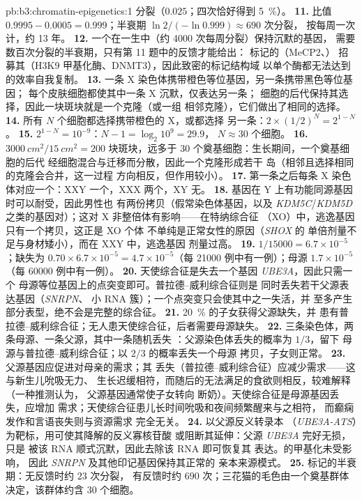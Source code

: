 \begin{solution}{pb:b3:chromatin-epigenetics:1}
分裂（$0.025$；四次恰好得到 \qty{5}{\%}）。
\textbf{11.} 比值 $0.9995 - 0.0005 = 0.999$；半衰期 $\ln
2/(-\ln 0.999) \approx 690$ 次分裂，
按每周一次计，约 \num{13} 年。
\textbf{12.} 一个在一生中（约 \num{4000} 次每周分裂）保持沉默的基因，
需要数百次分裂的半衰期，只有第 11 题中的反馈才能给出：
标记的（MeCP2、）
招募其（H3K9 甲基化酶、DNMT3），因此致密的标记结构域
以单个酶都无法达到的效率自我复制。
\textbf{13.} 一条 X 染色体携带橙色等位基因，另一条携带黑色等位基因；
每个皮肤细胞都使其中一条 X 沉默，仅表达另一条；
细胞的后代保持其选择，因此一块斑块就是一个克隆（或一组
相邻克隆），它们做出了相同的选择。
\textbf{14.} 所有 $N$ 个细胞都选择携带橙色的 X，或都选择
另一条：$2\times (1/2)^{N} = 2^{1-N}$。
\textbf{15.} $2^{1-N} = 10^{-9}$：$N - 1 = \log_{2} 10^{9} = 29.9$，
$N \approx 30$ 个细胞。
\textbf{16.} $\qty{3000}{cm^2}/\qty{15}{cm^2} = 200$ 块斑块，远多于
$30$ 个奠基细胞：生长期间，一个奠基细胞的后代
经细胞混合与迁移而分散，因此一个克隆形成若干
岛（相邻且选择相同的克隆会合并，这一过程
方向相反，但作用较小）。
\textbf{17.} 第一条之后每条 X 染色体对应一个：XXY 一个，XXX 两个，XY
无。
\textbf{18.} 基因在 Y 上有功能同源基因时可以耐受，因此男性也
有两份拷贝（假常染色体基因，以及
\emph{KDM5C}/\emph{KDM5D} 之类的基因对）；这对 X 非整倍体有影响——在特纳综合征
（XO）中，逃逸基因只有一个拷贝，这正是 XO 个体
不单纯是正常女性的原因（\emph{SHOX} 的
单倍剂量不足与身材矮小），而在 XXY 中，逃逸基因
剂量过高。
\textbf{19.} $1/\num{15000} = 6.7\times 10^{-5}$；缺失为 $0.70\times
6.7\times 10^{-5} = 4.7\times 10^{-5}$（每 \num{21000} 例中有一例）；母源
 $1.7\times 10^{-5}$（每 \num{60000} 例中有一例）。
\textbf{20.} 天使综合征是失去一个基因 \emph{UBE3A}，因此只需一个
母源等位基因上的点突变即可。普拉德–威利综合征则是
同时丢失若干父源表达基因（\emph{SNRPN}、
小 RNA 簇）；一个点突变只会使其中之一失活，并
至多产生部分表型，绝不会是完整的综合征。
\textbf{21.} \qty{20}{\%} 的子女获得父源缺失，并
患有普拉德–威利综合征；无人患天使综合征，后者需要母源缺失。
\textbf{22.} 三条染色体，两条母源、一条父源，其中一条随机丢失
：父源染色体丢失的概率为 $1/3$，留下
母源与普拉德–威利综合征；以 $2/3$ 的概率丢失一个母源
拷贝，子女则正常。
\textbf{23.} 父源基因应促进对母亲的需求；其
丢失（普拉德–威利综合征）应减少需求——这与新生儿吮吸无力、
生长迟缓相符，而随后的无法满足的食欲则相反，较难解释
（一种推测认为，
父源基因通常使子女转向
断奶）。天使综合征是母源基因丢失，应增加
需求；天使综合征患儿长时间吮吸和夜间频繁醒来与之相符，
而癫痫发作和言语丧失则与资源需求
完全无关。
\textbf{24.} 以父源反义转录本
（\emph{UBE3A-ATS}）为靶标，用可使其降解的反义寡核苷酸
或阻断其延伸：父源 \emph{UBE3A} 完好无损，只是
被该 RNA 顺式沉默，因此去除该 RNA 即可恢复其
表达。的甲基化未受影响，
因此 \emph{SNRPN} 及其他印记基因保持其正常的
亲本来源模式。
\textbf{25.} 标记的半衰期：无反馈时约 $23$ 次分裂，
有反馈时约 $690$ 次；三花猫的毛色由一个奠基群体
决定，该群体约含 $30$ 个细胞。
\end{solution}
